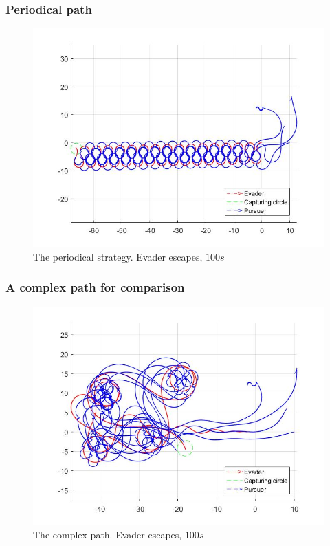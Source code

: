 \documentclass[ebook,11pt] {kth-mag}
\begin{document}
\subsubsection{Periodical path}
\begin{figure}[H]
\centering
\includegraphics[scale=0.35]{open_periodic_path}
\caption{The periodical strategy. Evader escapes, $100 s$}
\end{figure}


\subsubsection{A complex path for comparison}
\begin{figure}[H]
\centering
\includegraphics[scale=0.35]{open_complex_path_for_comparison}
\caption{The complex path. Evader escapes, $100 s$}
\end{figure}
\end{document}
